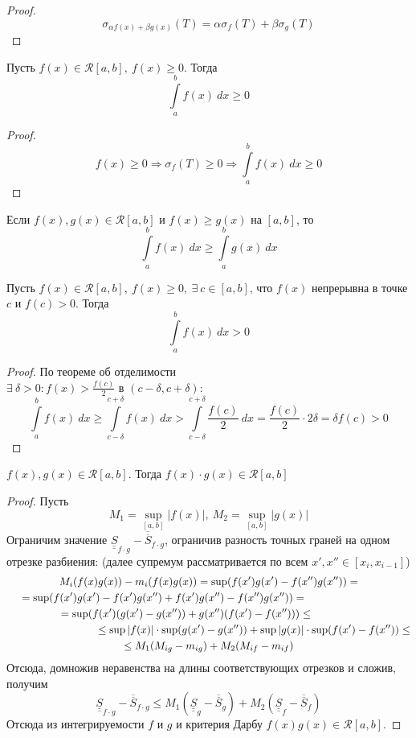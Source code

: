 \begin{proof}
    \[\sigma_{\alpha f(x)+\beta g(x)}(T)=\alpha\sigma_f(T)+\beta\sigma_g(T)\]
\end{proof}
\begin{numtheorem}
    Пусть $f(x)\in \mathcal{R}[a,b],\ f(x)\geq 0$. Тогда
    \[\int\limits_{a}^{b}f(x)\ dx\geq 0\]
\end{numtheorem}
\begin{proof}
    \[f(x)\geq 0 \Rightarrow \sigma_f(T)\geq 0 \Rightarrow \int\limits_{a}^{b} f(x)\ dx \geq 0\]
\end{proof} 
\begin{consequense}
    Если $f(x), g(x)\in \mathcal{R}[a,b]$ и $f(x)\geq g(x)$ на $[a,b]$, то 
    \[\int\limits_{a}^{b}f(x)\ dx\geq \int\limits_{a}^{b}g(x)\ dx\]
\end{consequense}
\begin{numtheorem}
    Пусть $f(x)\in \mathcal{R}[a,b],\ f(x)\geq 0,\ \exists\ c\in[a,b]$, что $f(x)$ непрерывна в точке $c$ и $f(c)>0$. Тогда 
    \[\int\limits_{a}^{b}f(x)\ dx>0\]
\end{numtheorem}
\begin{proof}
    По теореме об отделимости\\
    $\exists\ \delta>0: f(x)>\frac{f(c)}{2}$ в $(c-\delta, c+\delta):$
    \[\int\limits_{a}^{b}f(x)\ dx\geq \int\limits_{c-\delta}^{c+\delta}f(x)\ dx>\int\limits_{c-\delta}^{c+\delta}\frac{f(c)}{2}\ dx=\frac{f(c)}{2}\cdot 2\delta=\delta f(c)>0\]
\end{proof}
\begin{numtheorem}
    $f(x), g(x)\in \mathcal{R}[a,b]$. Тогда $f(x)\cdot g(x)\in \mathcal{R}[a,b]$
\end{numtheorem}
\begin{proof} Пусть 
    \[M_1=\sup\limits_{[a,b]}|f(x)|,\ M_2=\sup\limits_{[a,b]}|g(x)|\]
    Ограничим значение $\underline{\underline{S}}_{f\cdot g}-\overline{\overline{S}}_{f\cdot g}$, ограничив разность точных граней на одном отрезке разбиения: (далее супремум рассматривается по всем $x',x''\in[x_i,x_{i-1}]$)
    \begin{multline*}
        M_i(f(x)g(x))-m_i(f(x)g(x))=\sup(f(x')g(x')-f(x'')g(x''))=\\
        =\sup(f(x')g(x')-f(x')g(x'')+f(x')g(x'')-f(x'')g(x''))=\tab[3cm]\\
        =\sup(f(x')(g(x')-g(x''))+g(x'')(f(x')-f(x'')))\leq\tab[1.5cm]\\
        \tab[3cm]\leq \sup|f(x)|\cdot \sup(g(x')-g(x''))+\sup|g(x)|\cdot \sup(f(x')-f(x''))\leq \\
        \leq M_1 (M_{ig}-m_{ig})+M_2(M_{if}-m_{if})
    \end{multline*}
    Отсюда, домножив неравенства на длины соответствующих отрезков и сложив, получим
    \begin{equation*}
        \underline{\underline{S}}_{f\cdot g}-\overline{\overline{S}}_{f\cdot g}\leq M_1(\underline{\underline{S}}_g-\overline{\overline{S}}_g)+M_2(\underline{\underline{S}}_f-\overline{\overline{S}}_f)
    \end{equation*}
    Отсюда из интегрируемости $f$ и $g$ и критерия Дарбу $f(x)g(x) \in \mathcal{R}[a, b]$.  
\end{proof}